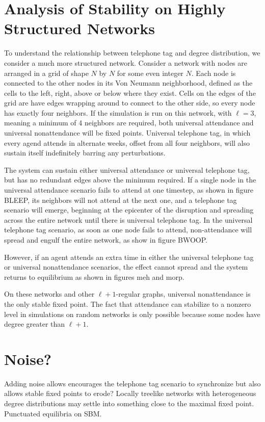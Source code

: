 \documentclass[12pt]{article}
\begin{document}
\section{Analysis of Stability on Highly Structured Networks}

To understand the relationship between telephone tag and degree distribution, we consider a much more structured network.  Consider a network with nodes are arranged in a grid of shape $N$ by $N$ for some even integer $N$.  Each node is connected to the other nodes in its Von Neumann neighborhood, defined as the cells to the left, right, above or below where they exist.  Cells on the edges of the grid are have edges wrapping around to connect to the other side, so every node has exactly four neighbors.  If the simulation is run on this network, with $\ell = 3$, meaning a minimum of 4 neighbors are required, both universal attendance and universal nonattendance will be fixed points.  Universal telephone tag, in which every agend attends in alternate weeks, offset from all four neighbors, will also sustain itself indefinitely barring any perturbations.

The system can sustain either universal attendance or universal telephone tag, but has no redundant edges above the minimum required.  If a single node in the universal attendance scenario fails to attend at one timestep, as shown in figure BLEEP, its neighbors will not attend at the next one, and a telephone tag scenario will emerge, beginning at the epicenter of the disruption and spreading across the entire network until there is universal telephone tag.  In the universal telephone tag scenario, as soon as one node fails to attend, non-attendance will spread and engulf the entire network, as show in figure BWOOP.

However, if an agent attends an extra time in either the universal telephone tag or universal nonattendance scenarios, the effect cannot spread and the system returns to equilibrium as shown in figures meh and morp.

On these networks and other $\ell + 1$-regular graphs, universal nonattendance is the only stable fixed point.  The fact that attendance can stabilize to a nonzero level in simulations on random networks is only possible because some nodes have degree greater than $\ell + 1$.

\section{Noise?}
Adding noise allows encourages the telephone tag scenario to synchronize but also allows stable fixed points to erode?  Locally treelike networks with heterogeneous degree distributions may settle into something close to the maximal fixed point.  Punctuated equilibria on SBM.
\end{document}
